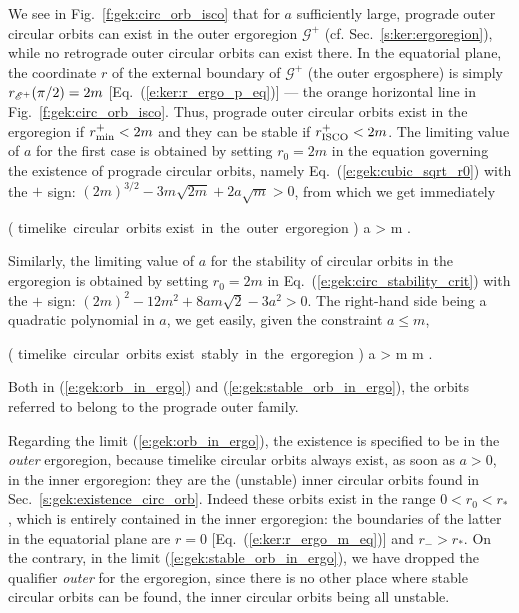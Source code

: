 We see in Fig.~\ref{f:gek:circ_orb_isco} that for $a$ sufficiently large,
prograde outer circular orbits can exist in the outer ergoregion $\mathscr{G}^+$
(cf. Sec.~\ref{s:ker:ergoregion}), while no retrograde outer circular orbits
can exist there.
In the equatorial plane, the coordinate $r$
of the external boundary of $\mathscr{G}^+$
(the outer ergosphere) is
simply $r_{\mathscr{E}^+}(\pi/2) = 2 m$ [Eq.~(\ref{e:ker:r_ergo_p_eq})] --- the orange
horizontal line in Fig.~\ref{f:gek:circ_orb_isco}.
Thus, prograde outer circular orbits exist in the ergoregion if
$r_{\rm min}^+ < 2 m$ and they can be stable if $r_{\rm ISCO}^+ < 2 m$.
The limiting value of $a$ for the first case is obtained by setting
$r_0 = 2 m$ in the equation governing the existence of prograde circular orbits,
namely Eq.~(\ref{e:gek:cubic_sqrt_r0}) with the $+$ sign:
$(2m)^{3/2} - 3 m \sqrt{2m} + 2 a \sqrt{m} > 0$,
from which we get immediately
\begin{greybox}
\be \label{e:gek:orb_in_ergo}
    \left( {\mbox{timelike circular orbits}\atop
     \mbox{exist in the outer ergoregion}} \right)
     \iff a >   m .
\ee
\end{greybox}
Similarly, the limiting value of $a$ for the stability of
circular orbits in the ergoregion is obtained by setting $r_0 = 2m$ in
Eq.~(\ref{e:gek:circ_stability_crit}) with the $+$ sign:
$(2 m)^2 - 12 m^2 + 8 a m\sqrt{2} - 3 a^2 > 0$.
The right-hand side being a quadratic polynomial in $a$, we get
easily, given the constraint $a \leq m$,
\begin{greybox}
\be \label{e:gek:stable_orb_in_ergo}
    \left( {\mbox{timelike circular orbits}\atop
     \mbox{exist stably in the ergoregion}} \right)
     \iff a >  m  m .
\ee
\end{greybox}
Both in (\ref{e:gek:orb_in_ergo}) and (\ref{e:gek:stable_orb_in_ergo}), the
orbits referred to belong to the prograde outer family.

\begin{remark}
Regarding the limit (\ref{e:gek:orb_in_ergo}), the existence is specified to
be in the \emph{outer} ergoregion, because timelike circular orbits always
exist, as soon as $a>0$, in the inner ergoregion: they are the (unstable) inner circular
orbits found in Sec.~\ref{s:gek:existence_circ_orb}. Indeed these orbits exist
in the range $0 < r_0 < r_*$, which is entirely contained in the
inner ergoregion: the boundaries of the latter in the equatorial plane are
$r=0$ [Eq.~(\ref{e:ker:r_ergo_m_eq})] and $r_- > r_*$.
On the contrary, in the limit (\ref{e:gek:stable_orb_in_ergo}), we have
dropped the qualifier \emph{outer} for the ergoregion, since there is no other
place where stable circular orbits can be found, the inner circular orbits
being all unstable.
\end{remark}

